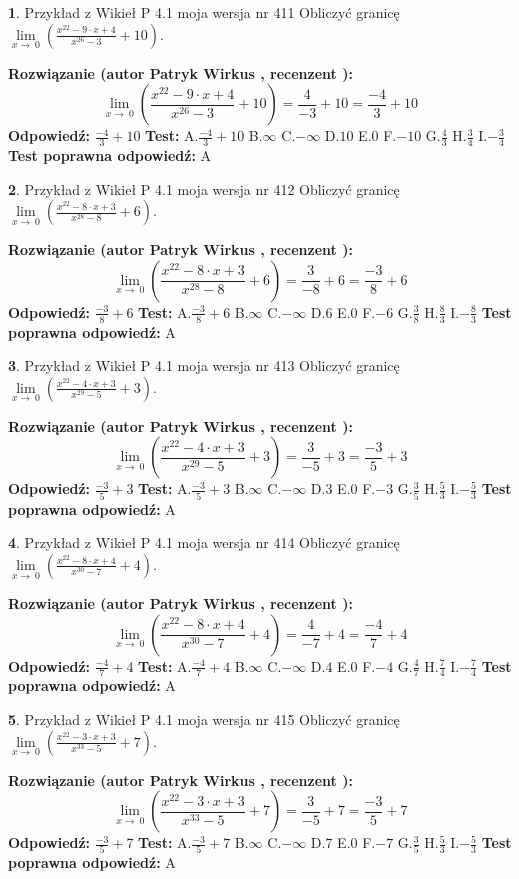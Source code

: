 \documentclass[12pt, a4paper]{article}
\theoremstyle{definition} %
\newtheorem{zad}{}
\newcommand{\zadStart}[1]{\begin{zad}#1\newline}
\newcommand{\zadStop}{\end{zad}}
\newcommand{\rozwStart}[2]{\noindent \textbf{Rozwiązanie (autor #1 , recenzent #2): }\newline}
\newcommand{\rozwStop}{\newline}
\newcommand{\odpStart}{\noindent \textbf{Odpowiedź:}\newline}
\newcommand{\odpStop}{\newline}
\newcommand{\testStart}{\noindent \textbf{Test:}\newline}
\newcommand{\testStop}{\newline}
\newcommand{\kluczStart}{\noindent \textbf{Test poprawna odpowiedź:}\newline}
\newcommand{\kluczStop}{\newline}
\begin{document}
\zadStart{Przykład z Wikieł P 4.1 moja wersja nr 411}
Obliczyć granicę $\lim\limits_{x\to\ 0}(\frac{x^{22}-9 \cdot x +4}{x^{26}-3}+10)$.
\zadStop
\rozwStart{Patryk Wirkus}{}
$$\lim\limits_{x\to\ 0}(\frac{x^{22}-9 \cdot x +4}{x^{26}-3}+10)=\frac{4}{-3}+10=\frac{-4}{3}+10$$
\rozwStop
\odpStart
$\frac{-4}{3}+10$
\odpStop
\testStart
A.$\frac{-4}{3}+10$
B.$\infty$
C.$-\infty$
D.$10$
E.$0$
F.$-10$
G.$\frac{4}{3}$
H.$\frac{3}{4}$
I.$-\frac{3}{4}$
\testStop
\kluczStart
A
\kluczStop



\zadStart{Przykład z Wikieł P 4.1 moja wersja nr 412}
Obliczyć granicę $\lim\limits_{x\to\ 0}(\frac{x^{22}-8 \cdot x +3}{x^{28}-8}+6)$.
\zadStop
\rozwStart{Patryk Wirkus}{}
$$\lim\limits_{x\to\ 0}(\frac{x^{22}-8 \cdot x +3}{x^{28}-8}+6)=\frac{3}{-8}+6=\frac{-3}{8}+6$$
\rozwStop
\odpStart
$\frac{-3}{8}+6$
\odpStop
\testStart
A.$\frac{-3}{8}+6$
B.$\infty$
C.$-\infty$
D.$6$
E.$0$
F.$-6$
G.$\frac{3}{8}$
H.$\frac{8}{3}$
I.$-\frac{8}{3}$
\testStop
\kluczStart
A
\kluczStop



\zadStart{Przykład z Wikieł P 4.1 moja wersja nr 413}
Obliczyć granicę $\lim\limits_{x\to\ 0}(\frac{x^{22}-4 \cdot x +3}{x^{29}-5}+3)$.
\zadStop
\rozwStart{Patryk Wirkus}{}
$$\lim\limits_{x\to\ 0}(\frac{x^{22}-4 \cdot x +3}{x^{29}-5}+3)=\frac{3}{-5}+3=\frac{-3}{5}+3$$
\rozwStop
\odpStart
$\frac{-3}{5}+3$
\odpStop
\testStart
A.$\frac{-3}{5}+3$
B.$\infty$
C.$-\infty$
D.$3$
E.$0$
F.$-3$
G.$\frac{3}{5}$
H.$\frac{5}{3}$
I.$-\frac{5}{3}$
\testStop
\kluczStart
A
\kluczStop



\zadStart{Przykład z Wikieł P 4.1 moja wersja nr 414}
Obliczyć granicę $\lim\limits_{x\to\ 0}(\frac{x^{22}-8 \cdot x +4}{x^{30}-7}+4)$.
\zadStop
\rozwStart{Patryk Wirkus}{}
$$\lim\limits_{x\to\ 0}(\frac{x^{22}-8 \cdot x +4}{x^{30}-7}+4)=\frac{4}{-7}+4=\frac{-4}{7}+4$$
\rozwStop
\odpStart
$\frac{-4}{7}+4$
\odpStop
\testStart
A.$\frac{-4}{7}+4$
B.$\infty$
C.$-\infty$
D.$4$
E.$0$
F.$-4$
G.$\frac{4}{7}$
H.$\frac{7}{4}$
I.$-\frac{7}{4}$
\testStop
\kluczStart
A
\kluczStop



\zadStart{Przykład z Wikieł P 4.1 moja wersja nr 415}
Obliczyć granicę $\lim\limits_{x\to\ 0}(\frac{x^{22}-3 \cdot x +3}{x^{33}-5}+7)$.
\zadStop
\rozwStart{Patryk Wirkus}{}
$$\lim\limits_{x\to\ 0}(\frac{x^{22}-3 \cdot x +3}{x^{33}-5}+7)=\frac{3}{-5}+7=\frac{-3}{5}+7$$
\rozwStop
\odpStart
$\frac{-3}{5}+7$
\odpStop
\testStart
A.$\frac{-3}{5}+7$
B.$\infty$
C.$-\infty$
D.$7$
E.$0$
F.$-7$
G.$\frac{3}{5}$
H.$\frac{5}{3}$
I.$-\frac{5}{3}$
\testStop
\kluczStart
A
\kluczStop
\end{document}
